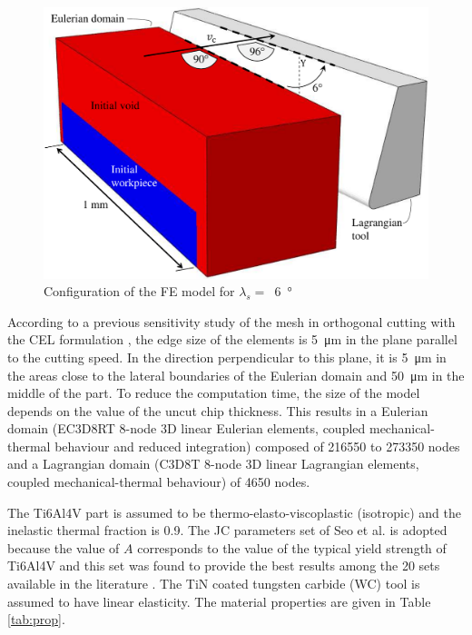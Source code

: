 \documentclass[preprint,12pt,times]{elsarticle}
\begin{document}
\begin{figure}[!h]
\centering
\includegraphics[width = 140 mm]{Figures/FEConfig}
\caption{Configuration of the FE model for $\lambda_s =$~\qty{6}{\degree}}
\label{fig:FEConfig}
\end{figure}

According to a previous sensitivity study of the mesh in orthogonal cutting with the CEL formulation \cite{ducobu_Finite_2017}, the edge size of the elements is \qty{5}{\um} in the plane parallel to the cutting speed. In the direction perpendicular to this plane, it is \qty{5}{\um} in the areas close to the lateral boundaries of the Eulerian domain and \qty{50}{\um} in the middle of the part. To reduce the computation time, the size of the model depends on the value of the uncut chip thickness. This results in a Eulerian domain (EC3D8RT 8-node 3D linear Eulerian elements, coupled mechanical-thermal behaviour and reduced integration) composed of \num{216550} to \num{273350} nodes and a Lagrangian domain (C3D8T 8-node 3D linear Lagrangian elements, coupled mechanical-thermal behaviour) of \num{4650} nodes.

The Ti6Al4V part is assumed to be thermo-elasto-viscoplastic (isotropic) and the inelastic thermal fraction is 0.9. The JC parameters set of Seo et al. \cite{seo_Constitutive_2005} is adopted because the value of $A$ corresponds to the value of the typical yield strength of Ti6Al4V and this set was found to provide the best results among the 20 sets available in the literature \cite{ducobu_Importance_2017}.  The TiN coated tungsten carbide (WC) tool is assumed to have linear elasticity. The material properties are given in Table \ref{tab:prop}.
\end{document}
